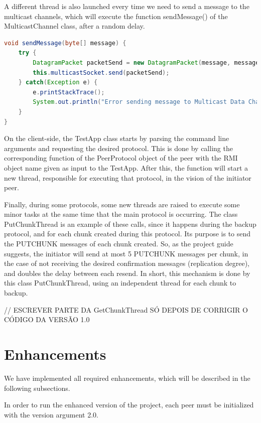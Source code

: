 \documentclass[11pt]{article}
\begin{document}
A different thread is also launched every time we need to send a message to the multicast channels, which will execute the function sendMessage() of the MulticastChannel class, after a random delay.

\begin{lstlisting}[language=java]
void sendMessage(byte[] message) {
    try {
        DatagramPacket packetSend = new DatagramPacket(message, message.length, this.addr, this.port);
        this.multicastSocket.send(packetSend);
    } catch(Exception e) {
        e.printStackTrace();
        System.out.println("Error sending message to Multicast Data Channel (MDB)");
    }
}
\end{lstlisting}

On the client-side, the TestApp class starts by parsing the command line arguments and requesting the desired protocol.
This is done by calling the corresponding function of the PeerProtocol object of the peer with the RMI object name given as input to the TestApp.
After this, the function will start a new thread, responsible for executing that protocol, in the vision of the initiator peer.


Finally, during some protocols, some new threads are raised to execute some minor tasks at the same time that the main protocol is occurring.
The class PutChunkThread is an example of these calls, since it happens during the backup protocol, and for each chunk created during this protocol. Its purpose is to send the PUTCHUNK messages of each chunk created.
So, as the project guide suggests, the initiator will send at most 5 PUTCHUNK messages per chunk, in the case of not receiving the desired confirmation messages (replication degree), and doubles the delay between each resend.
In short, this mechanism is done by this class PutChunkThread, using an independent thread for each chunk to backup.


// ESCREVER PARTE DA GetChunkThread SÓ DEPOIS DE CORRIGIR O CÓDIGO DA VERSÃO 1.0

\pagebreak

\section{Enhancements}

We have implemented all required enhancements, which will be described in the following subsections.

In order to run the enhanced version of the project, each peer must be initialized with the version argument 2.0.
\end{document}

